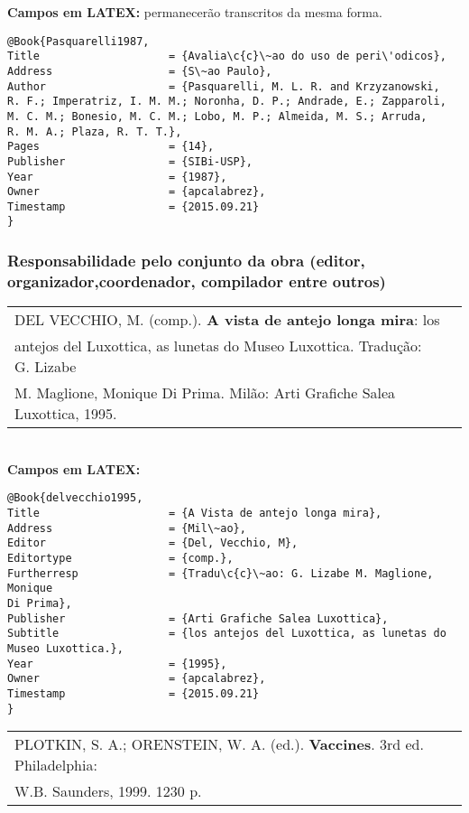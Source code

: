\textbf{Campos em LATEX:} permanecer\~ao transcritos da mesma forma.\\

\begin{verbatim}
@Book{Pasquarelli1987,
Title                    = {Avalia\c{c}\~ao do uso de peri\'odicos},
Address                  = {S\~ao Paulo},
Author                   = {Pasquarelli, M. L. R. and Krzyzanowski,
R. F.; Imperatriz, I. M. M.; Noronha, D. P.; Andrade, E.; Zapparoli,
M. C. M.; Bonesio, M. C. M.; Lobo, M. P.; Almeida, M. S.; Arruda, 
R. M. A.; Plaza, R. T. T.},
Pages                    = {14},
Publisher                = {SIBi-USP},
Year                     = {1987},
Owner                    = {apcalabrez},
Timestamp                = {2015.09.21}
}
\end{verbatim}


\subsubsection{Responsabilidade pelo conjunto da obra (editor, organizador,coordenador, compilador entre outros)}

\begin{tabular}{|l|c|} \hline
	DEL VECCHIO, M. (comp.). \textbf{A vista de antejo longa mira}: los \\antejos
	del  Luxottica, as lunetas do Museo Luxottica. Tradu\c{c}\~ao: G. Lizabe \\M. Maglione,  Monique Di Prima. Mil\~ao: Arti Grafiche Salea Luxottica, 1995.  \\\hline
\end{tabular}\\

\textbf{Campos em LATEX:}

\begin{verbatim}
@Book{delvecchio1995,
Title                    = {A Vista de antejo longa mira},
Address                  = {Mil\~ao},
Editor                   = {Del, Vecchio, M},
Editortype               = {comp.},
Furtherresp              = {Tradu\c{c}\~ao: G. Lizabe M. Maglione, Monique 
Di Prima},
Publisher                = {Arti Grafiche Salea Luxottica},
Subtitle                 = {los antejos del Luxottica, as lunetas do 
Museo Luxottica.},
Year                     = {1995},
Owner                    = {apcalabrez},
Timestamp                = {2015.09.21}
}
\end{verbatim}

\begin{tabular}{|l|c|} \hline
	PLOTKIN, S. A.; ORENSTEIN, W. A. (ed.). \textbf{Vaccines}. 3rd ed. Philadelphia: \\ W.B. Saunders, 1999. 1230 p.  \\\hline
\end{tabular}\\

